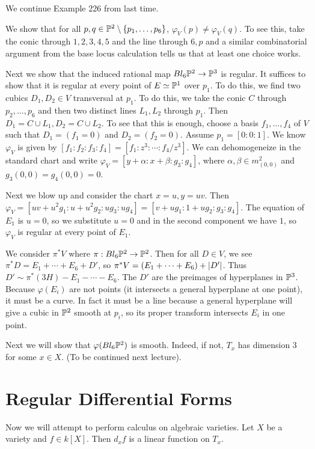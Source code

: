 \documentclass[twoside, 10pt]{article}
\begin{document}
        We continue Example 226 from last time.
        \begin{exm*}
        We show that for all $p,q \in \P^2 \setminus \{p_1, \ldots, p_6 \}$, $\varphi_V(p) \neq \varphi_V(q)$. To see this, take the conic through $1,2,3,4,5$ and the line through $6,p$ and a similar combinatorial argument from the base locus calculation tells us that at least one choice works.

        Next we show that the induced rational map $Bl_6 \P^2 \to \P^3$ is regular. It suffices to show that it is regular at every point of $E \simeq \P^1$ over $p_1$. To do this, we find two cubics $D_1, D_2 \in V$ transversal at $p_1$. To do this, we take the conic $C$ through $p_2, \ldots, p_6$ and then two distinct lines $L_1, L_2$ through $p_1$. Then $D_1 = C \cup L_1, D_2 = C \cup L_2$. To see that this is enough, choose a basis $f_1, \ldots, f_4$ of $V$ such that $D_1 = (f_1 = 0)$ and $D_2 = (f_2 = 0)$. Assume $p_1 = [0:0:1]$. We know $\varphi_V$ is given by $[f_1:f_2:f_3:f_4] = [f_1:z^3: \cdots : f_4/z^3]$. We can dehomogeneize in the standard chart and write $\varphi_V = [y + \alpha:x + \beta:g_3:g_4]$, where $\alpha,\beta \in m_{(0,0)}^2$ and $g_3(0,0) = g_4(0,0) = 0$. 

        Next we blow up and consider the chart $x=u,y=uv$. Then $\varphi_V = [uv+u^2g_1:u+u^2g_2:ug_3:ug_4] = [v+ug_1:1+ug_2:g_3:g_4]$. The equation of $E_1$ is $u=0$, so we substitute $u=0$ and in the second component we have $1$, so $\varphi_V$ is regular at every point of $E_1$.
        \end{exm*}

        \begin{rmk}
            We consider $\pi^* V$ where $\pi: Bl_6 \P^2 \to \P^2$. Then for all $D \in V$, we see $\pi^* D = E_1 + \cdots + E_6 + D'$, so $\pi^*V = (E_1 + \cdots + E_6) + \abs{D'}$. Thus $D' \sim \pi^*(3H) - E_1 - \cdots - E_6$. The $D'$ are the preimages of hyperplanes in $\P^3$. Because $\varphi(E_i)$ are not points (it intersects a general hyperplane at one point), it must be a curve. In fact it must be a line because a general hyperplane will give a cubic in $\P^2$ smooth at $p_i$, so its proper transform intersects $E_i$ in one point.
        \end{rmk}

        Next we will show that $\varphi(Bl_6 \P^2)$ is smooth. Indeed, if not, $T_x$ has dimension $3$ for some $x \in X$. (To be continued next lecture).

        \section{Regular Differential Forms}%
        Now we will attempt to perform calculus on algebraic varieties. Let $X$ be a variety and $f \in k[X]$. Then $d_xf$ is a linear function on $T_x$.
\end{document}
